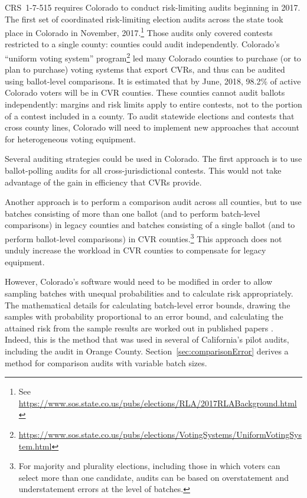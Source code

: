 \documentclass[runningheads]{llncs}
\begin{document}
CRS~1-7-515 requires Colorado to conduct risk-limiting audits beginning in 2017.
The first set of coordinated risk-limiting election audits across the state took place in Colorado in November, 2017.\footnote{%
 See \url{https://www.sos.state.co.us/pubs/elections/RLA/2017RLABackground.html}
}
Those audits only covered contests restricted to a single county:
counties could audit independently.
Colorado's ``uniform voting system'' program\footnote{%
  \url{https://www.sos.state.co.us/pubs/elections/VotingSystems/UniformVotingSystem.html}
} 
led many Colorado counties to purchase (or to plan to purchase) voting systems
that export CVRs, and thus can be audited using ballot-level comparisons.
It is estimated that by June, 2018, 98.2\% of active Colorado voters will be in CVR counties.
These counties cannot audit ballots independently:
margins and risk limits apply to entire contests, not to the portion of a contest included in a county.
To audit statewide elections and contests that cross county lines, Colorado will need to implement new approaches
that account for heterogeneous voting equipment.

Several auditing strategies could be used in Colorado.
The first approach is to use ballot-polling audits for all cross-jurisdictional contests.
This would not take advantage of the gain in efficiency that CVRs provide.

Another approach is to perform a comparison audit across all counties, but to use batches consisting
of more than one ballot (and to perform batch-level comparisons)
in legacy counties and batches consisting of a single ballot (and to perform ballot-level comparisons) in CVR counties.\footnote{%
 For majority and plurality elections, including those in which voters can select more than one candidate,
  audits can be based on overstatement and understatement errors at the level of batches.
}
This approach does not unduly increase the workload in CVR counties
to compensate for legacy equipment.

However, Colorado's software would need to be modified in order to allow sampling batches with
unequal probabilities and to calculate risk appropriately.
The mathematical details for calculating
batch-level error bounds, drawing the samples with probability proportional to an
error bound, and calculating the attained risk from the sample results are worked out
in published papers \cite{stark09c,stark09b,stark10d}.
Indeed, this is the method that was used in several of California's pilot audits,
including the audit in Orange County.
Section~\ref{sec:comparisonError} derives a method for comparison audits with variable batch sizes.
\end{document}

